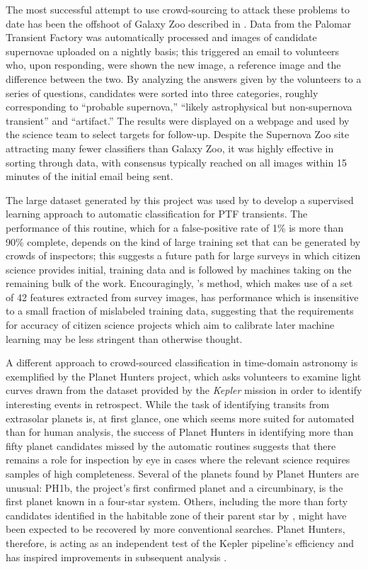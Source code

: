 \documentclass{ar2e}
\begin{document}
The most successful attempt to use crowd-sourcing to attack these problems to
date has been the offshoot of Galaxy Zoo described in \citet{SmithSN}.  Data
from the Palomar Transient Factory \citep{LawPTF} was automatically processed
and images of candidate supernovae uploaded on a nightly basis; this triggered
an email to volunteers who, upon responding, were shown the new image, a
reference image and the difference between the two. By analyzing the answers
given by the volunteers to a series of questions, candidates were sorted into 
three categories, roughly corresponding to ``probable supernova,'' ``likely
astrophysical but non-supernova transient'' and ``artifact.'' The results were
displayed on a webpage and used by the science team to select targets for
follow-up. Despite the Supernova Zoo site attracting many fewer classifiers 
than Galaxy Zoo, it was highly effective in sorting through data,  with
consensus typically reached on all images within 15 minutes of the initial email
being sent. 

The large dataset generated by this project was used by \citet{Brink} to develop
a supervised learning approach to automatic classification for PTF transients.
The performance of this routine, which for a false-positive rate of 1\% is more
than 90\% complete, depends on the kind of large training set that can be
generated by crowds of inspectors; this suggests a future path for large surveys
in which citizen science provides initial, training data and is followed by
machines taking on the remaining bulk of the work. Encouragingly,
\citeauthor{Brink}'s method, which makes use of a set of 42 features extracted
from survey images, has performance which is insensitive to a small fraction of
mislabeled training data, suggesting that the requirements for accuracy of
citizen science projects which aim to calibrate later machine learning may be
less stringent than otherwise thought. 

A different approach to crowd-sourced classification in time-domain astronomy is
exemplified by the Planet Hunters project, which asks volunteers to examine
light curves drawn from the dataset provided by the \emph{Kepler} mission in
order to identify interesting events in retrospect. While the task of
identifying transits from extrasolar planets is, at first glance, one which
seems more suited for automated than for human analysis, the success of Planet
Hunters in identifying more than fifty planet candidates missed by the automatic
routines suggests that there remains a role for inspection by eye in cases where
the relevant science requires samples of high completeness. Several of the
planets found by Planet Hunters are unusual: PH1b, the project's first confirmed
planet \citep{Schwamb++2013} and a circumbinary, is the first planet known in a
four-star system. Others, including the more than forty candidates identified in
the habitable zone of their parent star by \citep{Wang++2013}, might have been
expected to be recovered by more conventional searches. Planet Hunters,
therefore, is acting as an independent test of the Kepler pipeline's efficiency
\citep{Schwamb++2012} and has inspired improvements in subsequent analysis
\citep{Batalha++2013}. 
\end{document}
